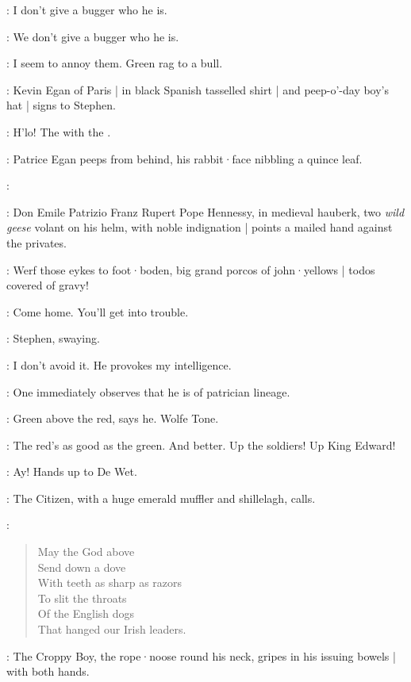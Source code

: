 \Carr:
I don't give a bugger who he is.

\Compton:
We don't give a bugger who he is.

\Stephen:
I seem to annoy them.
Green rag to a bull.

:
Kevin Egan of Paris |
in black Spanish tasselled shirt |
and peep-o'-day boy's hat |
signs to Stephen.

\KevinEgan:
H'lo!
The  with the .

:
Patrice Egan peeps from behind,
his rabbit·face nibbling a quince leaf.

\Patrice:

:
Don Emile Patrizio Franz Rupert Pope Hennessy,
in medieval hauberk,
two \emph{wild geese} volant on his helm,
with noble indignation |
points a mailed hand against the privates.

\DonEmile:
Werf those eykes to foot·boden,
big grand porcos of john·yellows |
todos covered of gravy!

\Bloom:
Come home.
You'll get into trouble.

:
Stephen,
swaying.

\Stephen:
I don't avoid it.
He provokes my intelligence.

\BiddyClap[2]:
One immediately observes that he is of patrician lineage.

\Virago[2]:
Green above the red,
says he.
Wolfe Tone.

\Bawd[2]:
The red's as good as the green.
And better.
Up the soldiers!
Up King Edward!%

\ARough[2]:
Ay!
Hands up to De Wet.

:
The Citizen,
with a huge emerald muffler and shillelagh,
calls.

\Citizen:
\begin{verse}
    May the God above\\
    Send down a dove\\
    With teeth as sharp as razors\\
    To slit the throats\\
    Of the English dogs\\
%
    That hanged our Irish leaders.
\end{verse}

:
The Croppy Boy,
the rope·noose round his neck,
gripes in his issuing bowels |
with both hands.

